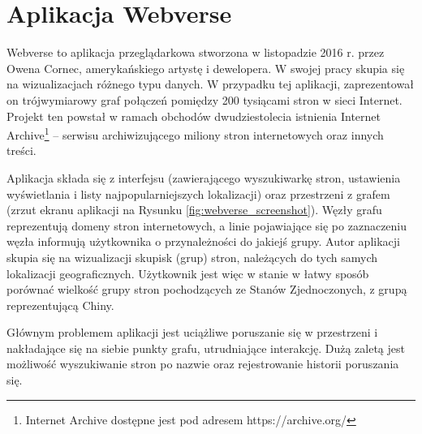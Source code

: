 \section{Aplikacja Webverse}

Webverse \cite{Webverse} to aplikacja przeglądarkowa stworzona w listopadzie 2016 r. przez Owena Cornec, amerykańskiego artystę i dewelopera. W swojej pracy skupia się na wizualizacjach różnego typu danych. W przypadku tej aplikacji, zaprezentował on trójwymiarowy graf połączeń pomiędzy 200 tysiącami stron w sieci Internet. Projekt ten powstał w ramach obchodów dwudziestolecia istnienia Internet Archive\footnote{Internet Archive dostępne jest pod adresem https://archive.org/} – serwisu archiwizującego miliony stron internetowych oraz innych treści.

Aplikacja składa się z interfejsu (zawierającego wyszukiwarkę stron, ustawienia wyświetlania i listy najpopularniejszych lokalizacji) oraz przestrzeni z grafem (zrzut ekranu aplikacji na Rysunku \ref{fig:webverse_screenshot}). Węzły grafu reprezentują domeny stron internetowych, a linie pojawiające się po zaznaczeniu węzła informują użytkownika o przynależności do jakiejś grupy. Autor aplikacji skupia się na wizualizacji skupisk (grup) stron, należących do tych samych lokalizacji geograficznych. Użytkownik jest więc w stanie w łatwy sposób porównać wielkość grupy stron pochodzących ze Stanów Zjednoczonych, z grupą reprezentującą Chiny.

Głównym problemem aplikacji jest uciążliwe poruszanie się w przestrzeni i nakładające się na siebie punkty grafu, utrudniające interakcję. Dużą zaletą jest możliwość wyszukiwanie stron po nazwie oraz rejestrowanie historii poruszania się.

